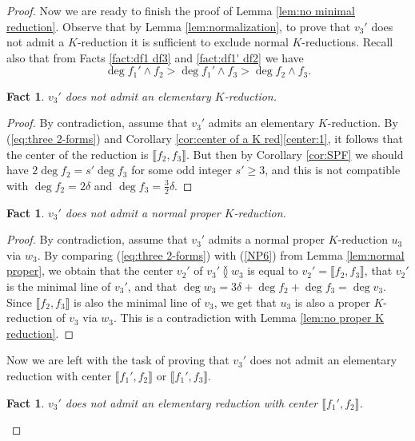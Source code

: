 \documentclass[reqno,oneside,11pt]{amsart}
\theoremstyle{plain}
\newtheorem{fact}[theorem]{Fact}
\theoremstyle{definition}
\renewcommand{\ne}{\between}
\newcommand{\llb}{\llbracket}
\newcommand{\rrb}{\rrbracket}
\renewcommand{\ge}{\geqslant}
\begin{document}
\begin{proof}
Now we are ready to finish the proof of Lemma \ref{lem:no minimal reduction}.
Observe that by Lemma \ref{lem:normalization}, to prove that $v_3'$ does not
admit a $K$-reduction it is sufficient to exclude normal $K$-reductions.
Recall also that from Facts \ref{fact:df1 df3} and \ref{fact:df1' df2} we have
\begin{equation} \label{eq:three 2-forms}
\deg f_1' \wedge f_2 > \deg f_1' \wedge f_3 > \deg f_2 \wedge f_3.
\end{equation}



\begin{fact} \label{fact:elementary K}
$v_3'$ does not admit an elementary $K$-reduction.
\end{fact}

\begin{proof}
By contradiction, assume that $v_3'$ admits an elementary $K$-reduction.
By (\ref{eq:three 2-forms}) and Corollary \ref{cor:center of a K
red}\ref{center:1}, it follows that the center of the reduction is $\llb f_2,
f_3 \rrb$.
But then by Corollary \ref{cor:SPF} we should have $2\deg f_2 = s' \deg f_3$ for some odd integer $s' \ge 3$, and this is not compatible with $\deg f_2 = 2\delta$ and $\deg f_3 = \frac32 \delta$.
\end{proof}

\begin{fact} \label{fact:proper K}
$v_3'$ does not admit a normal proper $K$-reduction.
\end{fact}

\begin{proof}
By contradiction, assume that $v_3'$ admits a normal proper $K$-reduction $u_3$ via $w_3$.
By comparing (\ref{eq:three 2-forms}) with (\ref{NP6}) from Lemma
\ref{lem:normal proper}, we obtain that the center $v_2'$ of $v_3' \ne w_3$ is
equal to $v_2' = \llb f_2, f_3 \rrb$, that $v_2'$ is the minimal line of
$v_3'$, and that $\deg w_3 = 3\delta + \deg f_2 + \deg f_3 = \deg v_3$.
Since $\llb f_2, f_3 \rrb$ is also the minimal line of $v_3$, we
get that $u_3$ is also a proper $K$-reduction of $v_3$ via $w_3$.
This is a contradiction with Lemma \ref{lem:no proper K reduction}.
\end{proof}

Now we are left with the task of proving that $v_3'$ does not admit an
elementary reduction with center $\llb f_1', f_2 \rrb$ or $\llb f_1', f_3 \rrb$.

\begin{fact} \label{fact:no f1'f2}
$v_3'$ does not admit an elementary reduction with center $\llb f_1', f_2 \rrb$.
\end{fact}


\end{proof}
\end{document}
